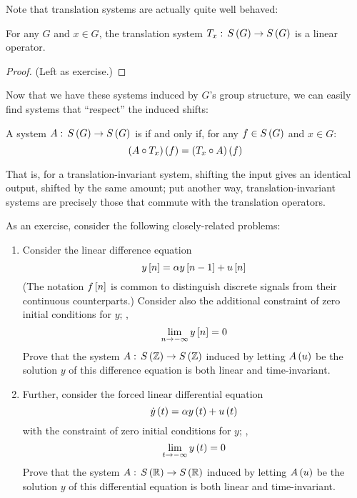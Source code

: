 Note that translation systems are actually quite well behaved:
\begin{claim}
For any $G$ and $x \in G$, the translation system $T_x: \, S\left( G \right) \to S\left( G \right)$ is a linear operator.
\end{claim}
\begin{proof}
(Left as exercise.)
\end{proof}

Now that we have these systems induced by $G$'s group structure, we can easily find systems that ``respect'' the induced shifts:
\begin{definition}
A system $A: \, S\left( G \right) \to S\left( G \right)$ is  if and only if, for any $f \in S\left( G \right)$ and $x \in G$:
\[ \left(A \circ T_x\right)\left( f \right) = \left(T_x \circ A\right)\left( f \right) \]
\end{definition}
That is, for a translation-invariant system, shifting the input gives an identical output, shifted by the same amount; put another way, translation-invariant systems are precisely those that commute with the translation operators.

\begin{example}
As an exercise, consider the following closely-related problems: 

\begin{enumerate}
    \item Consider the linear difference equation
    \[ y\left[ n \right] = \alpha y\left[ n - 1 \right] + u\left[ n \right] \]
    (The notation $f\left[ n \right]$ is common to distinguish discrete signals from their continuous counterparts.) Consider also the additional constraint of zero initial conditions for $y$; \ie,
    \[ \lim_{n \to -\infty} y\left[ n \right] = 0 \]
    Prove that the system $A: \, S\left( \mathbb{Z} \right) \to S\left( \mathbb{Z} \right)$ induced by letting $A\left( u \right)$ be the solution $y$ of this difference equation is both linear and time-invariant.
    \item Further, consider the forced linear differential equation
    \[ \dot{y}\left( t \right) = \alpha y\left( t \right) + u\left( t \right) \]
    with the constraint of zero initial conditions for $y$; \ie,
    \[ \lim_{t \to -\infty} y\left( t \right) = 0 \]
    Prove that the system $A: \, S\left( \mathbb{R} \right) \to S\left( \mathbb{R} \right)$ induced by letting $A\left( u \right)$ be the solution $y$ of this differential equation is both linear and time-invariant.
\end{enumerate}

\end{example}

